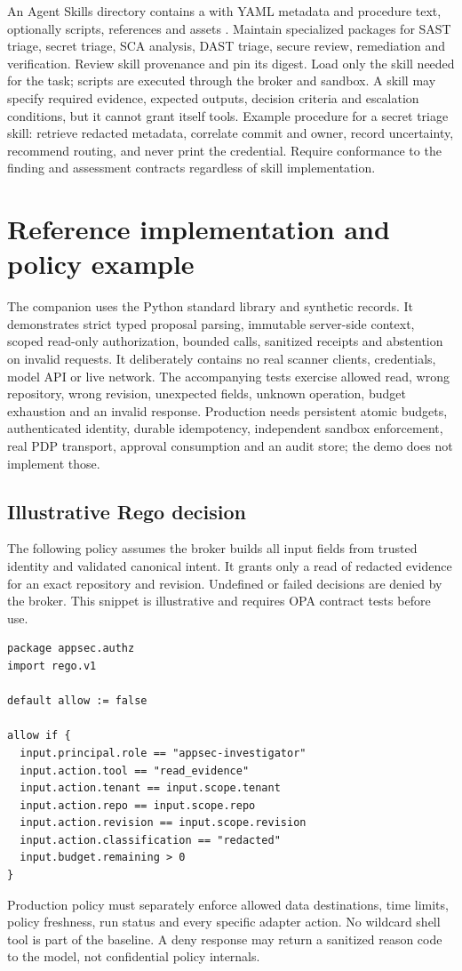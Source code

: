 \documentclass[11pt,letterpaper]{article}
\begin{document}
An Agent Skills directory contains a  with YAML metadata and procedure text, optionally scripts, references and assets \cite{skills}. Maintain specialized packages for SAST triage, secret triage, SCA analysis, DAST triage, secure review, remediation and verification. Review skill provenance and pin its digest. Load only the skill needed for the task; scripts are executed through the broker and sandbox. A skill may specify required evidence, expected outputs, decision criteria and escalation conditions, but it cannot grant itself tools. Example procedure for a secret triage skill: retrieve redacted metadata, correlate commit and owner, record uncertainty, recommend routing, and never print the credential. Require conformance to the finding and assessment contracts regardless of skill implementation.

\section{Reference implementation and policy example}
The companion  uses the Python standard library and synthetic records. It demonstrates strict typed proposal parsing, immutable server-side context, scoped read-only authorization, bounded calls, sanitized receipts and abstention on invalid requests. It deliberately contains no real scanner clients, credentials, model API or live network. The accompanying tests exercise allowed read, wrong repository, wrong revision, unexpected fields, unknown operation, budget exhaustion and an invalid response. Production needs persistent atomic budgets, authenticated identity, durable idempotency, independent sandbox enforcement, real PDP transport, approval consumption and an audit store; the demo does not implement those.

\subsection{Illustrative Rego decision}
The following policy assumes the broker builds all input fields from trusted identity and validated canonical intent. It grants only a read of redacted evidence for an exact repository and revision. Undefined or failed decisions are denied by the broker. This snippet is illustrative and requires OPA contract tests before use.
\begin{verbatim}
package appsec.authz
import rego.v1

default allow := false

allow if {
  input.principal.role == "appsec-investigator"
  input.action.tool == "read_evidence"
  input.action.tenant == input.scope.tenant
  input.action.repo == input.scope.repo
  input.action.revision == input.scope.revision
  input.action.classification == "redacted"
  input.budget.remaining > 0
}
\end{verbatim}
Production policy must separately enforce allowed data destinations, time limits, policy freshness, run status and every specific adapter action. No wildcard shell tool is part of the baseline. A deny response may return a sanitized reason code to the model, not confidential policy internals.
\end{document}
